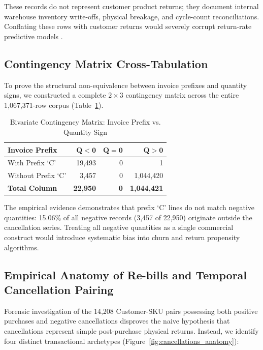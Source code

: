 \documentclass[journal,10pt,twocolumn]{IEEEtran}
\begin{document}
These records do not represent customer product returns; they document internal warehouse inventory write-offs, physical breakage, and cycle-count reconciliations. Conflating these rows with customer returns would severely corrupt return-rate predictive models \cite{returns2015predicting}.

\subsection{Contingency Matrix Cross-Tabulation}
To prove the structural non-equivalence between invoice prefixes and quantity signs, we constructed a complete $2 \times 3$ contingency matrix across the entire 1,067,371-row corpus (Table~\ref{tab:contingency_matrix}).

\begin{table}[htbp]
\caption{Bivariate Contingency Matrix: Invoice Prefix vs. Quantity Sign}
\label{tab:contingency_matrix}
\centering
\begin{tabularx}{\columnwidth}{Xrrr}
\toprule
\textbf{Invoice Prefix} & $\mathbf{Q < 0}$ & $\mathbf{Q = 0}$ & $\mathbf{Q > 0}$ \\
\midrule
With Prefix `C' & 19,493 & 0 & 1 \\
Without Prefix `C' & 3,457 & 0 & 1,044,420 \\
\midrule
\textbf{Total Column} & \textbf{22,950} & \textbf{0} & \textbf{1,044,421} \\
\bottomrule
\end{tabularx}
\end{table}

The empirical evidence demonstrates that prefix `C' lines do not match negative quantities: 15.06\% of all negative records (3,457 of 22,950) originate outside the cancellation series. Treating all negative quantities as a single commercial construct would introduce systematic bias into churn and return propensity algorithms.

\subsection{Empirical Anatomy of Re-bills and Temporal Cancellation Pairing}
Forensic investigation of the 14,208 Customer-SKU pairs possessing both positive purchases and negative cancellations disproves the naive hypothesis that cancellations represent simple post-purchase physical returns. Instead, we identify four distinct transactional archetypes (Figure~\ref{fig:cancellations_anatomy}):
\end{document}
